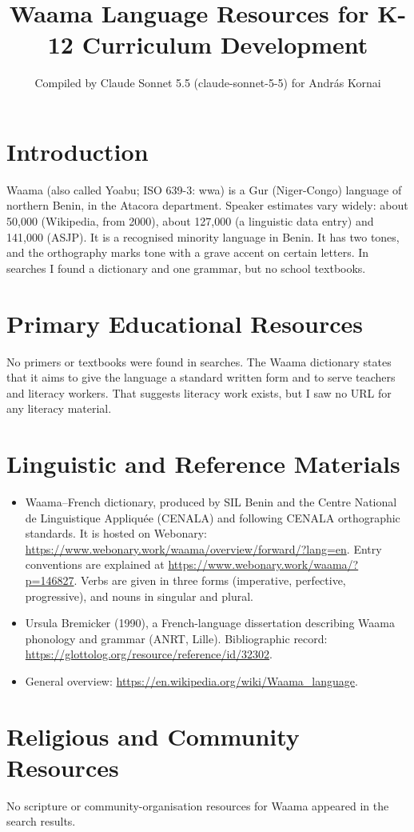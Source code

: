 \documentclass[12pt]{article}
\title{Waama Language Resources for K-12 Curriculum Development}
\author{Compiled by Claude Sonnet 5.5 (claude-sonnet-5-5) for Andr\'as Kornai}
\date{}
\begin{document}
\maketitle

\section{Introduction}
Waama (also called Yoabu; ISO 639-3: wwa) is a Gur (Niger-Congo) language of northern Benin, in the Atacora department. Speaker estimates vary widely: about 50,000 (Wikipedia, from 2000), about 127,000 (a linguistic data entry) and 141,000 (ASJP). It is a recognised minority language in Benin. It has two tones, and the orthography marks tone with a grave accent on certain letters. In searches I found a dictionary and one grammar, but no school textbooks.

\section{Primary Educational Resources}
No primers or textbooks were found in searches. The Waama dictionary states that it aims to give the language a standard written form and to serve teachers and literacy workers. That suggests literacy work exists, but I saw no URL for any literacy material.

\section{Linguistic and Reference Materials}
\begin{itemize}
\item Waama--French dictionary, produced by SIL Benin and the Centre National de Linguistique Appliqu\'ee (CENALA) and following CENALA orthographic standards. It is hosted on Webonary: \url{https://www.webonary.work/waama/overview/forward/?lang=en}. Entry conventions are explained at \url{https://www.webonary.work/waama/?p=146827}. Verbs are given in three forms (imperative, perfective, progressive), and nouns in singular and plural.
\item Ursula Bremicker (1990), a French-language dissertation describing Waama phonology and grammar (ANRT, Lille). Bibliographic record: \url{https://glottolog.org/resource/reference/id/32302}.
\item General overview: \url{https://en.wikipedia.org/wiki/Waama_language}.
\end{itemize}

\section{Religious and Community Resources}
No scripture or community-organisation resources for Waama appeared in the search results.
\end{document}
